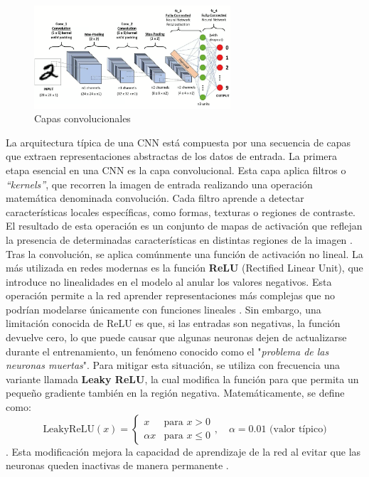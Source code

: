 \documentclass[12pt]{article} %
\begin{document}
\begin{figure}[!ht]
    \centering
    \includegraphics[width=0.65\textwidth]{CNN.png}
    \caption{Capas convolucionales \cite{datacamp_cnn}}
    \label{fig:capas_convolucionales}
\end{figure}
La arquitectura típica de una CNN está compuesta por una secuencia de capas que extraen representaciones abstractas de los datos de entrada. La primera etapa esencial en una CNN es la capa convolucional. Esta capa aplica filtros o \textit{“kernels”}, que recorren la imagen de entrada realizando una operación matemática denominada convolución. Cada filtro aprende a detectar características locales específicas, como formas, texturas o regiones de contraste. El resultado de esta operación es un conjunto de mapas de activación que reflejan la presencia de determinadas características en distintas regiones de la imagen \cite{lecun1998gradient}. \\

Tras la convolución, se aplica comúnmente una función de activación no lineal. La más utilizada en redes modernas es la función \textbf{ReLU} (Rectified Linear Unit), que introduce no linealidades en el modelo al anular los valores negativos. Esta operación permite a la red aprender representaciones más complejas que no podrían modelarse únicamente con funciones lineales \cite{nair2010rectified}. Sin embargo, una limitación conocida de ReLU es que, si las entradas son negativas, la función devuelve cero, lo que puede causar que algunas neuronas dejen de actualizarse durante el entrenamiento, un fenómeno conocido como el "\textit{problema de las neuronas muertas}". Para mitigar esta situación, se utiliza con frecuencia una variante llamada \textbf{Leaky ReLU}, la cual modifica la función para que permita un pequeño gradiente también en la región negativa. Matemáticamente, se define como: \[
\text{LeakyReLU}(x) = 
\begin{cases} 
x & \text{para } x > 0 \\
\alpha x & \text{para } x \le 0 
\end{cases}, \quad
\alpha = 0.01 \text{ (valor típico)}
\]. Esta modificación mejora la capacidad de aprendizaje de la red al evitar que las neuronas queden inactivas de manera permanente \cite{maas2013rectifier}. \\
\end{document}
